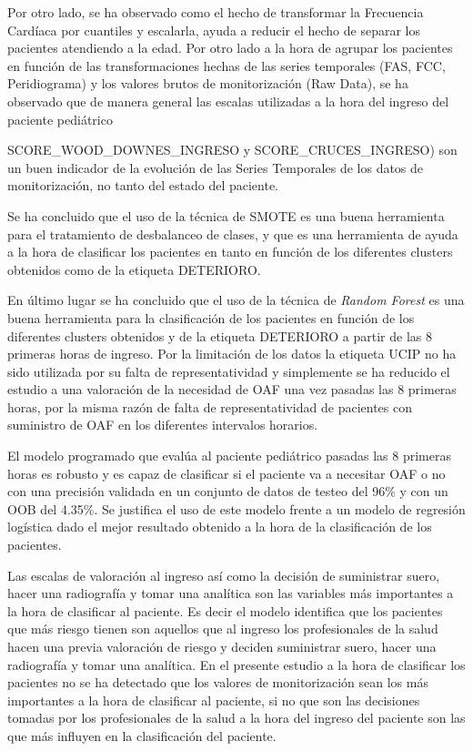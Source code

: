 Por otro lado, se ha observado como el hecho de transformar la Frecuencia Cardíaca por cuantiles y escalarla, ayuda a reducir el hecho de separar los pacientes atendiendo a la edad. Por otro lado a la hora de agrupar los pacientes en función de las transformaciones hechas de las series temporales (FAS, FCC, Peridiograma) y los valores brutos de monitorización (Raw Data), se ha observado que de manera general las escalas utilizadas a la hora del ingreso del paciente pediátrico {SCORE\_WOOD\_DOWNES\_INGRESO y SCORE\_CRUCES\_INGRESO) son un buen indicador de la evolución de las Series Temporales de los datos de monitorización, no tanto del estado del paciente. 

Se ha concluido que el uso de la técnica de SMOTE es una buena herramienta para el tratamiento de desbalanceo de clases, y que es una herramienta de ayuda a la hora de clasificar los pacientes en tanto en función de los diferentes clusters obtenidos como de la etiqueta DETERIORO.

En último lugar se ha concluido que el uso de la técnica de \textit{Random Forest} es una buena herramienta para la clasificación de los pacientes en función de los diferentes clusters obtenidos y de la etiqueta DETERIORO a partir de las 8 primeras horas de ingreso. Por la limitación de los datos la etiqueta UCIP no ha sido utilizada por su falta de representatividad y simplemente se ha reducido el estudio a una valoración de la necesidad de OAF una vez pasadas las 8 primeras horas, por la misma razón de falta de representatividad de pacientes con suministro de OAF en los diferentes intervalos horarios.

El modelo programado que evalúa al paciente pediátrico pasadas las 8 primeras horas es robusto y es capaz de clasificar si el paciente va a necesitar OAF o no con una precisión validada en un conjunto de datos de testeo del 96\% y con un OOB del 4.35\%. Se justifica el uso de este modelo frente a un modelo de regresión logística dado el mejor resultado obtenido a la hora de la clasificación de los pacientes.

Las escalas de valoración al ingreso así como la decisión de suministrar suero, hacer una radiografía y tomar una analítica son las variables más importantes a la hora de clasificar al paciente. Es decir el modelo identifica que los pacientes que más riesgo tienen son aquellos que al ingreso los profesionales de la salud hacen una previa valoración de riesgo y deciden suministrar suero, hacer una radiografía y tomar una analítica. En el presente estudio a la hora de clasificar los pacientes no se ha detectado que los valores de monitorización sean los más importantes a la hora de clasificar al paciente, si no que son las decisiones tomadas por los profesionales de la salud a la hora del ingreso del paciente son las que más influyen en la clasificación del paciente.

}
